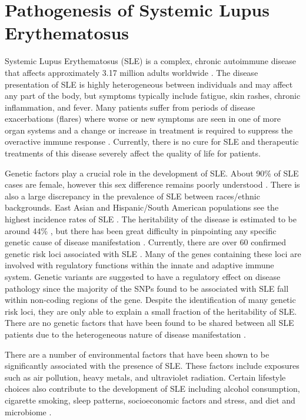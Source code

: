 \newpage
\section{Pathogenesis of Systemic Lupus Erythematosus}

Systemic Lupus Erythematosus (SLE) is a complex, chronic autoimmune disease that affects approximately 3.17 million adults worldwide \cite{slepath, Tian_2022}. The disease presentation of SLE is highly heterogeneous between individuals and may affect any part of the body, but symptoms typically include fatigue, skin rashes, chronic inflammation, and fever. Many patients suffer from periods of disease exacerbations (flares) where worse or new symptoms are seen in one of more organ systems and a change or increase in treatment is required to suppress the overactive immune response \cite{Adamichou_2017}. Currently, there is no cure for SLE and therapeutic treatments of this disease severely affect the quality of life for patients.

Genetic factors play a crucial role in the development of SLE. About 90\% of SLE cases are female, however this sex difference remains poorly understood \cite{Furst_2012, Nusbaum_2020}. There is also a large discrepancy in the prevalence of SLE between races/ethnic backgrounds. East Asian and Hispanic/South American populations see the highest incidence rates of SLE \cite{Woo_2022}. The heritability of the disease is estimated to be around 44\% \cite{Kuo_2015}, but there has been great difficulty in pinpointing any specific genetic cause of disease manifestation \cite{Ceccarelli_2015}. Currently, there are over 60 confirmed genetic risk loci associated with SLE \cite{TERUEL2016161}. Many of the genes containing these loci are involved with regulatory functions within the innate and adaptive immune system. Genetic variants are suggested to have a regulatory effect on disease pathology since the majority of the SNPs found to be associated with SLE fall within non-coding regions of the gene. Despite the identification of many genetic risk loci, they are only able to explain a small fraction of the heritability of SLE. There are no genetic factors that have been found to be shared between all SLE patients due to the heterogeneous nature of disease manifestation \cite{Ceccarelli_2015}. 

There are a number of environmental factors that have been shown to be significantly associated with the presence of SLE. These factors include exposures such as air pollution, heavy metals, and ultraviolet radiation. Certain lifestyle choices also contribute to the development of SLE including alcohol consumption, cigarette smoking, sleep patterns, socioeconomic factors and stress, and diet and microbiome \cite{Woo_2022}. 


